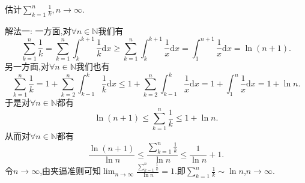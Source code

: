 \documentclass[../../main.tex]{subfiles}
\begin{document}
\begin{example}\label{example:4.461111}
估计$\sum_{k=1}^n{\frac{1}{k}},n\rightarrow \infty $.
\end{example}
\begin{solution}
{\color{blue}解法一:}
一方面,对\(\forall n\in\mathbb{N}\)我们有
\[
\sum_{k = 1}^n\frac{1}{k}=\sum_{k = 1}^n\int_{k}^{k + 1}\frac{1}{k}\mathrm{d}x\geqslant\sum_{k = 1}^n\int_{k}^{k + 1}\frac{1}{x}\mathrm{d}x=\int_{1}^{n + 1}\frac{1}{x}\mathrm{d}x=\ln(n + 1).
\]
另一方面,对\(\forall n\in\mathbb{N}\)我们也有
\[
\sum_{k = 1}^n\frac{1}{k}=1+\sum_{k = 2}^n\int_{k - 1}^{k}\frac{1}{k}\mathrm{d}x\leqslant1+\sum_{k = 2}^n\int_{k - 1}^{k}\frac{1}{x}\mathrm{d}x=1+\int_{1}^{n}\frac{1}{x}\mathrm{d}x=1+\ln n.
\]
于是对\(\forall n\in\mathbb{N}\)都有
\[
\ln(n + 1)\leqslant\sum_{k = 1}^n\frac{1}{k}\leqslant1+\ln n.
\]
从而对\(\forall n\in\mathbb{N}\)都有
\[
\frac{\ln(n + 1)}{\ln n}\leqslant\frac{\sum\limits_{k = 1}^n\frac{1}{k}}{\ln n}\leqslant\frac{1}{\ln n}+1.
\]
令\(n\rightarrow\infty\),由夹逼准则可知\(\lim_{n\rightarrow\infty}\frac{\sum\limits_{k = 1}^n\frac{1}{k}}{\ln n}=1\).即\(\sum_{k = 1}^n\frac{1}{k}\sim\ln n\),\(n\rightarrow\infty\).


\end{solution}
\end{document}
